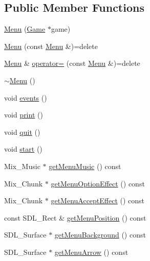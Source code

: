 \subsection*{Public Member Functions}
\begin{DoxyCompactItemize}
\item 
\hyperlink{classMenu_a91ec4975ad2aced80cd524a179dd7af1}{Menu} (\hyperlink{classGame}{Game} $\ast$game)
\item 
\hyperlink{classMenu_a63ab2f09293dba94a040e7303c069f5e}{Menu} (const \hyperlink{classMenu}{Menu} \&)=delete
\item 
\hyperlink{classMenu}{Menu} \& \hyperlink{classMenu_a2d63d2845c50e44eaf960876374f436a}{operator=} (const \hyperlink{classMenu}{Menu} \&)=delete
\item 
\hyperlink{classMenu_a831387f51358cfb88cd018e1777bc980}{$\sim$\-Menu} ()
\item 
void \hyperlink{classMenu_ac608f2d42a24c44578f3817218a36767}{events} ()
\item 
void \hyperlink{classMenu_aa6ff784314cc009478562d9ab7a0af34}{print} ()
\item 
void \hyperlink{classMenu_a5072c4d7aca8f9071c9ee9025a7019f9}{quit} ()
\item 
void \hyperlink{classMenu_ae1ec62e738dda7faaaec850bd0b58ffe}{start} ()
\item 
Mix\-\_\-\-Music $\ast$ \hyperlink{classMenu_a85a656aa9531a1308b5251c8f9df4cf3}{get\-Menu\-Music} () const 
\item 
Mix\-\_\-\-Chunk $\ast$ \hyperlink{classMenu_a9df0489e11835af740aa631ded1f1c07}{get\-Menu\-Option\-Effect} () const 
\item 
Mix\-\_\-\-Chunk $\ast$ \hyperlink{classMenu_a83ed1717ee5a549941e842f3250ca546}{get\-Menu\-Accept\-Effect} () const 
\item 
const S\-D\-L\-\_\-\-Rect \& \hyperlink{classMenu_a736db9878b209cde78a9ecd55e1adf11}{get\-Menu\-Position} () const 
\item 
S\-D\-L\-\_\-\-Surface $\ast$ \hyperlink{classMenu_adf2daad60f2175d887d8592998261c9a}{get\-Menu\-Background} () const 
\item 
S\-D\-L\-\_\-\-Surface $\ast$ \hyperlink{classMenu_a2e4f4c37e121c7446db8bb5ee2a214bc}{get\-Menu\-Arrow} () const 
\end{DoxyCompactItemize}


